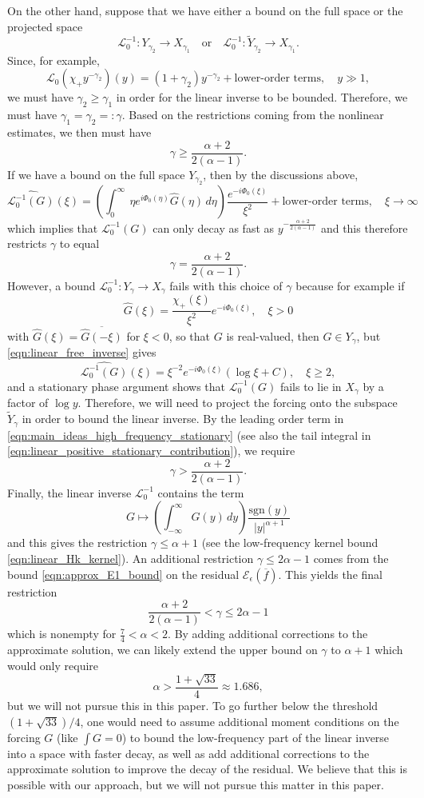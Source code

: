 \documentclass[11pt]{amsart}
\theoremstyle{definition}
\theoremstyle{remark}
\numberwithin{equation}{section}
\newcommand{\sq}[1]{\widetilde{#1}}
\newcommand{\mc}[1]{\mathcal{#1}}
\newcommand{\ov}[1]{\overline{#1}}
\begin{document}
On the other hand, suppose that we have either a bound on the full space or the projected space
\[\mc{L}_0^{-1} : Y_{\gamma_2} \to X_{\gamma_1} \quad \text{or} \quad \mc{L}_0^{-1} : \sq{Y}_{\gamma_2} \to X_{\gamma_1}.\]
Since, for example,
\[\mc{L}_0(\chi_+ y^{-\gamma_2})(y) = (1 + \gamma_2)y^{-\gamma_2} + \text{lower-order terms}, \quad y \gg 1,\]
we must have $\gamma_2 \geq \gamma_1$ in order for the linear inverse to be bounded. Therefore, we must have $\gamma_1 = \gamma_2 =: \gamma$. Based on the restrictions coming from the nonlinear estimates, we then must have
\[\gamma \geq \frac{\alpha + 2}{2(\alpha - 1)}.\]
If we have a bound on the full space $Y_{\gamma_2}$, then by the discussions above, 
\[\widehat{\mc{L}_0^{-1}(G)}(\xi) = \left(\int_{0}^\infty\ \eta e^{i\Phi_0(\eta)} \widehat{G}(\eta) \,d\eta\right)\frac{e^{-i\Phi_0(\xi)}}{\xi^2} + \text{lower-order terms}, \quad \xi \to \infty\]
which implies that $\mc{L}_0^{-1}(G)$ can only decay as fast as $y^{- \frac{\alpha + 2}{2(\alpha - 1)}}$ and this therefore restricts $\gamma$ to equal
\[\gamma = \frac{\alpha + 2}{2(\alpha - 1)}.\]
However, a bound $\mc{L}_0^{-1}: Y_\gamma \to X_\gamma$ fails with this choice of $\gamma$ because for example if
\[\widehat{G}(\xi) = \frac{\chi_+(\xi)}{\xi^2}e^{-i\Phi_0(\xi)}, \quad \xi > 0\]
with $\widehat{G}(\xi) = \overline{\widehat{G}(-\xi)}$ for $\xi < 0$, so that $G$ is real-valued, then $G \in Y_\gamma$, but \eqref{eqn:linear_free_inverse} gives
\[\widehat{\mc{L}_0^{-1}(G)}(\xi) = \xi^{-2}e^{-i\Phi_0(\xi)} (\log \xi + C), \quad \xi \geq 2,\]
and a stationary phase argument shows that $\mc{L}_0^{-1}(G)$ fails to lie in $X_\gamma$ by a factor of $\log y$. Therefore, we will need to project the forcing onto the subspace $\sq{Y}_\gamma$ in order to bound the linear inverse. By the leading order term in \eqref{eqn:main_ideas_high_frequency_stationary} (see also the tail integral in \eqref{eqn:linear_positive_stationary_contribution}), we require
\[\gamma > \frac{\alpha + 2}{2(\alpha - 1)}.\]
Finally, the linear inverse $\mc{L}_0^{-1}$ contains the term 
\[G \mapsto \left(\int_{-\infty}^{\infty}G(y) \, dy\right)\frac{\text{sgn}(y)}{|y|^{\alpha + 1}}\]
and this gives the restriction $\gamma \leq \alpha + 1$ (see the low-frequency kernel bound \eqref{eqn:linear_Hk_kernel}). An additional restriction $\gamma \leq 2\alpha - 1$ comes from the bound \eqref{eqn:approx_E1_bound} on the residual $\mc{E}_\epsilon(\ov{f})$. This yields the final restriction 
\[\frac{\alpha + 2}{2(\alpha - 1)} < \gamma \leq 2\alpha - 1\]
which is nonempty for $\frac{7}{4} < \alpha < 2$. By adding additional corrections to the approximate solution, we can likely extend the upper bound on $\gamma$ to $\alpha + 1$ which would only require
\[\alpha > \frac{1 + \sqrt{33}}{4} \approx 1.686,\]
but we will not pursue this in this paper. To go further below the threshold $(1 + \sqrt{33})/4$, one would need to assume additional moment conditions on the forcing $G$ (like $\int G = 0$) to bound the low-frequency part of the linear inverse into a space with faster decay, as well as add additional corrections to the approximate solution to improve the decay of the residual. We believe that this is possible with our approach, but we will not pursue this matter in this paper.
\end{document}
